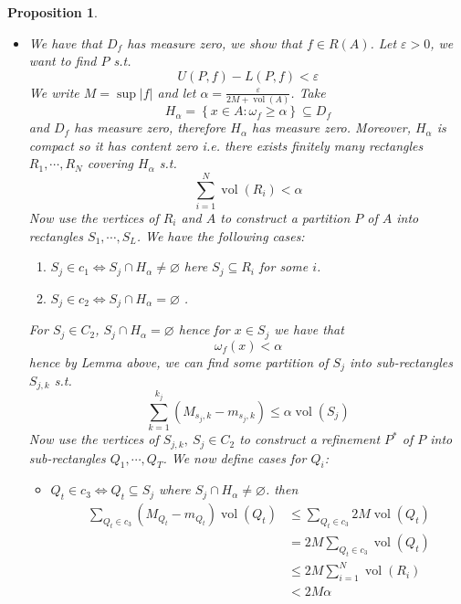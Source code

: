 \documentclass[11pt,a4paper]{article}
\theoremstyle{definition}
\theoremstyle{plain}
\newtheorem{proposition}[definition]{Proposition}
\theoremstyle{remark}
\renewcommand{\set}[1]{\left\{ #1 \right\}}
\newcommand{\abs}[1]{\lvert #1 \rvert}
\newcommand{\vol}{\operatorname{vol}}
\begin{document}
\begin{proposition}
\begin{itemize}
        \item[$\impliedby$] We have that $D_f$ has measure zero, we show that $f \in R(A)$. Let $\varepsilon > 0$, 
        we want to find $P$ s.t. 
        $$U(P,f)- L(P,f) < \varepsilon$$
        We write $M = \sup \abs{f}$ and let $\alpha = \frac{\varepsilon}{2M + \vol (A)}$. Take 
        $$H_\alpha = \set{x \in A \colon \omega_f \ge \alpha} \subseteq D_f$$
        and $D_f$ has measure zero, therefore $H_\alpha$ has measure zero. Moreover, $H_\alpha$ is compact so it has content zero 
        i.e. there exists finitely many rectangles $R_1, \cdots, R_N$ covering $H_\alpha$ s.t. 
        $$\sum_{i=1}^N \vol (R_i) < \alpha$$
        Now use the vertices of $R_i$ and $A$ to construct a partition $P$ of $A$ into rectangles $S_1, \cdots, S_L$. 
        We have the following cases: 
        \begin{enumerate}[label = \roman*)]
            \item $S_j \in c_1 \iff S_j \cap H_\alpha \ne \varnothing$ here $S_j \subseteq R_i$ for some $i$. 
            \item $S_j \in c_2 \iff S_j \cap H_\alpha = \varnothing$ .
        \end{enumerate}    
        For $S_j \in C_2$, $S_j \cap H_\alpha = \varnothing$  hence for $x \in S_j$ we have that 
        $$\omega_f (x) < \alpha$$
        hence by Lemma above, we can find some partition of $S_j$ into sub-rectangles $S_{j,k}$ s.t. 
        $$\sum_{k=1}^{k_j} (M_{s_j,k} - m_{s_j,k}) \le \alpha \vol (S_j)$$
        Now use the vertices of $S_{j,k}, \ S_j \in C_2$ to construct a refinement $P^*$ of $P$ into sub-rectangles $Q_1, \cdots, Q_T$. 
        We now define cases for $Q_i$: 
        \begin{itemize}
            \item $Q_t \in c_3 \iff Q_t \subseteq S_j$ where $S_j \cap H_\alpha \ne \varnothing$. then 
            \begin{align*}
                \sum_{Q_t \in c_3} (M_{Q_t} - m_{Q_t} ) \vol (Q_t) &\le \sum_{Q_t \in c_3} 2M \vol (Q_t) \\
                &= 2M \sum_{Q_t \in c_3} \vol (Q_t) \\
                &\le 2M \sum_{i=1}^N \vol(R_i) \\
                &< 2M \alpha
            \end{align*} 


\end{itemize}
\end{itemize}
\end{proposition}
\end{document}
